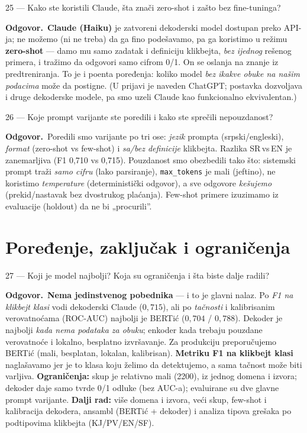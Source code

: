 \documentclass[11pt,a4paper]{article}
\newcommand{\kod}[1]{\texttt{#1}}
\newcommand{\odg}{\smallskip\noindent\textbf{Odgovor.}\ }
\begin{document}
\begin{pitanje}{25 --- Kako ste koristili Claude, šta znači zero-shot i zašto bez fine-tuninga?}
\end{pitanje}
\odg \textbf{Claude (Haiku)} je zatvoreni dekoderski model dostupan preko API-ja; ne
možemo (ni ne treba) da ga fino podešavamo, pa ga koristimo u režimu \textbf{zero-shot}
--- damo mu samo zadatak i definiciju klikbejta, \emph{bez ijednog} rešenog primera, i
tražimo da odgovori samo cifrom 0/1. On se oslanja na znanje iz predtreniranja. To je i
poenta poređenja: koliko model \emph{bez ikakve obuke na našim podacima} može da
postigne. (U prijavi je naveden ChatGPT; postavka dozvoljava i druge dekoderske modele,
pa smo uzeli Claude kao funkcionalno ekvivalentan.)

\begin{pitanje}{26 --- Koje prompt varijante ste poredili i kako ste sprečili nepouzdanost?}
\end{pitanje}
\odg Poredili smo varijante po tri ose: \emph{jezik} prompta (srpski/engleski),
\emph{format} (zero-shot vs few-shot) i \emph{sa/bez definicije} klikbejta. Razlika
SR\,vs\,EN je zanemarljiva (F1 0,710 vs 0,715). Pouzdanost smo obezbedili tako što:
sistemski prompt traži \emph{samo cifru} (lako parsiranje), \kod{max\_tokens} je mali
(jeftino), ne koristimo \emph{temperature} (deterministički odgovor), a sve odgovore
\emph{kešujemo} (prekid/nastavak bez dvostrukog plaćanja). Few-shot primere izuzimamo
iz evaluacije (holdout) da ne bi „procurili''.

\section{Poređenje, zaključak i ograničenja}

\begin{pitanje}{27 --- Koji je model najbolji? Koja su ograničenja i šta biste dalje radili?}
\end{pitanje}
\odg \textbf{Nema jedinstvenog pobednika} --- i to je glavni nalaz. Po \emph{F1 na
klikbejt klasi} vodi dekoderski Claude ($0{,}715$), ali po \emph{tačnosti} i
kalibrisanim verovatnoćama (ROC-AUC) najbolji je BERTić ($0{,}704$ / $0{,}788$). Dekoder
je najbolji \emph{kada nema podataka za obuku}; enkoder kada trebaju pouzdane
verovatnoće i lokalno, besplatno izvršavanje. Za produkciju preporučujemo BERTić (mali,
besplatan, lokalan, kalibrisan). \textbf{Metriku F1 na klikbejt klasi} naglašavamo jer
je to klasa koju želimo da detektujemo, a sama tačnost može biti varljiva.
\textbf{Ograničenja:} skup je relativno mali (2200), iz jednog domena i izvora; dekoder
daje samo tvrde 0/1 odluke (bez AUC-a); evaluirane su dve glavne prompt varijante.
\textbf{Dalji rad:} više domena i izvora, veći skup, few-shot i kalibracija dekodera,
ansambl (BERTić + dekoder) i analiza tipova grešaka po podtipovima klikbejta
(KJ/PV/EN/SF).
\end{document}

